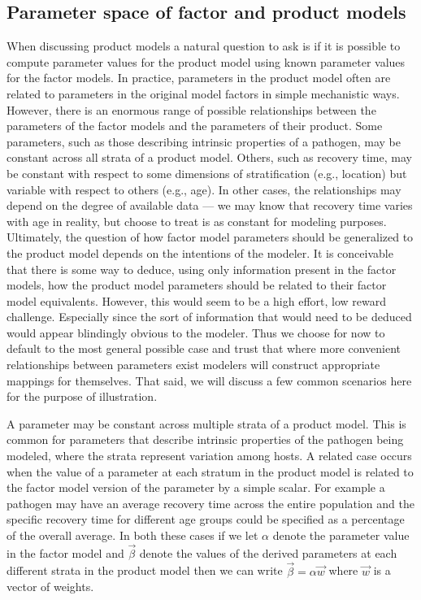 \documentclass[referee,sn-basic]{sn-jnl}%
\theoremstyle{definition}
\newcommand{\betavec}{\vec{\beta}}
\begin{document}
\subsection{Parameter space of factor and product models}

When discussing product models a natural question to ask is if it is possible to compute parameter values for the product model using known parameter values for the factor models.
In practice, parameters in the product model often are related to parameters in the original model factors in simple mechanistic ways. However, there is an enormous range of possible relationships between the parameters of the factor models and the parameters of their product.
Some parameters, such as those describing intrinsic properties of a pathogen, may be constant across all strata of a product model. Others, such as recovery time, may be constant with respect to some dimensions of stratification (e.g., location) but variable with respect to others (e.g., age). In other cases, the relationships may depend on the degree of available data --- we may know that recovery time varies with age in reality, but choose to treat is as constant for modeling purposes. Ultimately, the question of how factor model parameters should be generalized to the product model depends on the intentions of the modeler. It is conceivable that there is some way to deduce, using only information present in the factor models, how the product model parameters should be related to their factor model equivalents. However, this would seem to be a high effort, low reward challenge. Especially since the sort of information that would need to be deduced would appear blindingly obvious to the modeler. Thus we choose for now to default to the most general possible case and trust that where more convenient relationships between parameters exist modelers will construct appropriate mappings for themselves. That said, we will discuss a few common scenarios here for the purpose of illustration. 

A parameter may be constant across multiple strata of a product model. This is common for parameters that describe intrinsic properties of the pathogen being modeled, where the strata represent variation among hosts. A related case occurs when the value of a parameter at each stratum in the product model is related to the factor model version of the parameter by a simple scalar. For example a pathogen may have an average recovery time across the entire population and the specific recovery time for different age groups could be specified as a percentage of the overall average. In both these cases if we let $\alpha$ denote the parameter value in the factor model and $\betavec$ denote the values of the derived parameters at each different strata in the product model then we can write $\betavec = \alpha\vec{w}$ where $\vec{w}$ is a vector of weights.
\end{document}
